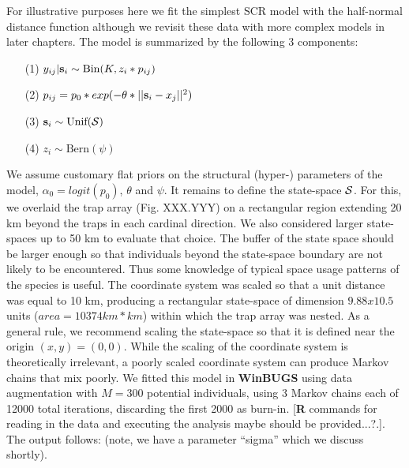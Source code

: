 For illustrative purposes here we fit the simplest SCR model with the
half-normal distance function although we revisit these data with more
complex models in later chapters. The model is summarized by the
following 3 components:
\begin{itemize}
\item[(1)] $y_{ij}|{\bf s}_{i} \sim \mbox{Bin}(K, z_{i}*p_{ij})$
\item[(2)] $p_{ij} = p_{0}*exp(-\theta*||{\bf s}_{i}-x_{j}||^2)$
\item[(3)] $ {\bf s}_{i} \sim \mbox{Unif}({\cal S})$
\item[(4)] $ z_{i} \sim \mbox{Bern}(\psi)$
\end{itemize}		
We assume customary flat priors on the structural (hyper-) parameters
of the model, $\alpha_{0} = logit(p_{0})$, $\theta$ and $\psi$.  It remains to define the
state-space ${\cal S}$. For this, we overlaid the trap array (Fig. XXX.YYY) on
a rectangular region extending 20 km beyond the traps in each cardinal
direction.  We also considered larger state-spaces up to 50 km to
evaluate that choice.  The buffer of the state space should be larger
enough so that individuals beyond the state-space boundary are not
likely to be encountered. Thus some knowledge of typical space usage
patterns of the species is useful.  The coordinate system was scaled
so that a unit distance was equal to 10 km, producing a rectangular
state-space of dimension $9.88 x 10.5$ units ($area = 10374 km*km$)
within which the trap array was nested. As a general rule, we
recommend scaling the state-space so that it is defined near the
origin $(x,y)=(0,0)$. While the scaling of the coordinate system is
theoretically irrelevant, a poorly scaled coordinate system can
produce Markov chains that mix poorly.  We fitted this model in
{\bf WinBUGS} using data augmentation with $M=300$ potential individuals,
using 3 Markov chains each of 12000 total iterations, discarding the
first 2000 as burn-in.  [{\bf R} commands for reading in the data and
executing the analysis maybe should be provided...?.]. The output
follows: (note, we have a parameter ``sigma'' which we discuss
shortly).

